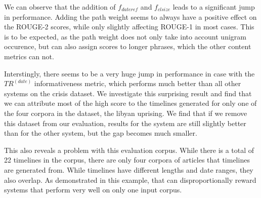 \documentclass[a4paper,BCOR=10mm]{report}
\numberwithin{lemma}{chapter}
\numberwithin{definition}{chapter}
\begin{document}
We can observe that the addition of $f_{dateref}$ and $f_{clsize}$ leads to a significant jump in performance.
Adding the path weight seems to always have a positive effect on the ROUGE-2 scores, while only slightly affecting ROUGE-1 in most cases.
This is to be expected, as the path weight does not only take into account unigram occurence, but can also assign scores to longer phrases, which the other content metrics can not.

Interstingly, there seems to be a very huge jump in performance in case with the $TR^{(date)}$ informativeness metric, which performs much better than all other systems on the crisis dataset. We investigate this surprising result and find that we can attribute most of the high score to the timelines generated for only one of the four corpora in the dataset, the libyan uprising.
We find that if we remove this dataset from our evaluation, results for the system are still slightly better than for the other system, but the gap becomes much smaller.

This also reveals a problem with this evaluation corpus. While there is a total of 22 timelines in the corpus, there are only four corpora of articles that timelines are generated from. While timelines have different lengths and date ranges, they also overlap. As demonstrated in this example, that can disproportionally reward systems that perform very well on only one input corpus.
\end{document}
